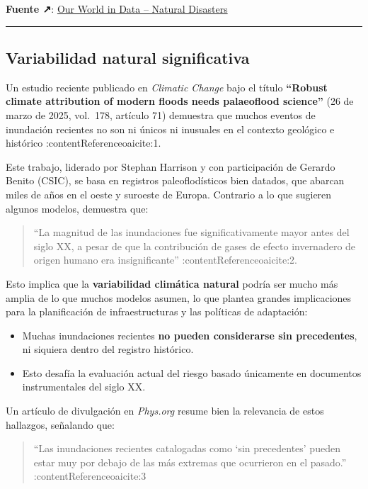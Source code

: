 \documentclass[
  11pt,
  a4paper,
  DIV=11,
  numbers=noendperiod]{scrreprt}
\providecommand{\tightlist}{%
  \setlength{\itemsep}{0pt}\setlength{\parskip}{0pt}}
\begin{document}
\textbf{Fuente ↗}:
\href{https://ourworldindata.org/natural-disasters}{Our World in Data --
Natural Disasters}

\begin{center}\rule{0.5\linewidth}{0.5pt}\end{center}

\subsection{Variabilidad natural
significativa}\label{variabilidad-natural-significativa}

Un estudio reciente publicado en \emph{Climatic Change} bajo el título
\textbf{``Robust climate attribution of modern floods needs palaeoflood
science''} (26 de marzo de 2025, vol.~178, artículo 71) demuestra que
muchos eventos de inundación recientes no son ni únicos ni inusuales en
el contexto geológico e histórico :contentReference{oaicite:1}.

Este trabajo, liderado por Stephan Harrison y con participación de
Gerardo Benito (CSIC), se basa en registros paleoflodísticos bien
datados, que abarcan miles de años en el oeste y suroeste de Europa.
Contrario a lo que sugieren algunos modelos, demuestra que:

\begin{quote}
``La magnitud de las inundaciones fue significativamente mayor antes del
siglo XX, a pesar de que la contribución de gases de efecto invernadero
de origen humano era insignificante'' :contentReference{oaicite:2}.
\end{quote}

Esto implica que la \textbf{variabilidad climática natural} podría ser
mucho más amplia de lo que muchos modelos asumen, lo que plantea grandes
implicaciones para la planificación de infraestructuras y las políticas
de adaptación:

\begin{itemize}
\tightlist
\item
  Muchas inundaciones recientes \textbf{no pueden considerarse sin
  precedentes}, ni siquiera dentro del registro histórico.
\item
  Esto desafía la evaluación actual del riesgo basado únicamente en
  documentos instrumentales del siglo XX.
\end{itemize}

Un artículo de divulgación en \emph{Phys.org} resume bien la relevancia
de estos hallazgos, señalando que:

\begin{quote}
``Las inundaciones recientes catalogadas como `sin precedentes' pueden
estar muy por debajo de las más extremas que ocurrieron en el pasado.''
:contentReference{oaicite:3}
\end{quote}
\end{document}
